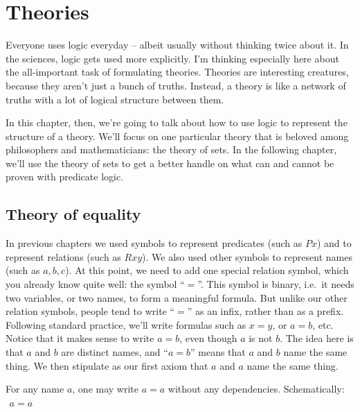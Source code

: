 \chapter{Theories} \label{theories}

Everyone uses logic everyday -- albeit usually without thinking twice
about it.  In the sciences, logic gets used more explicitly.  I'm
thinking especially here about the all-important task of formulating
theories.  Theories are interesting creatures, because they aren't
just a bunch of truths.  Instead, a theory is like a network of truths
with a lot of logical structure between them.

In this chapter, then, we're going to talk about how to use logic to
represent the structure of a theory.  We'll focus on one particular
theory that is beloved among philosophers and mathematicians: the
theory of sets.  In the following chapter, we'll use the theory of
sets to get a better handle on what can and cannot be proven with
predicate logic.

\section{Theory of equality}

In previous chapters we used symbols to represent predicates (such as
$Px$) and to represent relations (such as $Rxy$).  We also used other
symbols to represent names (such as $a,b,c$).  At this point, we need
to add one special relation symbol, which you already know quite well:
the symbol ``$=$''.  This symbol is binary, i.e.\ it needs two
variables, or two names, to form a meaningful formula.  But unlike our
other relation symbols, people tend to write ``$=$'' as an infix,
rather than as a prefix.  Following standard practice, we'll write
formulas such as $x=y$, or $a=b$, etc.  Notice that it makes sense to
write $a=b$, even though $a$ is not $b$.  The idea here is that $a$
and $b$ are distinct names, and ``$a=b$'' means that $a$ and $b$ name
the same thing.  We then stipulate as our first axiom that $a$ and $a$
name the same thing.

\begin{tcolorbox}[enhanced,width=10cm,title=Equality Introduction ({$=$}I),attach boxed title to top
  left={yshift=-2mm,xshift=4mm},boxed title style={sharp corners}]
For any name $a$, one may write $a=a$ without any \newline dependencies.
Schematically:
$\begin{array}{c}
     \mbox{} \\
     \hline a=a \end{array}$
\end{tcolorbox}

